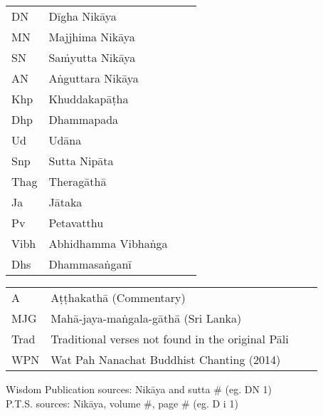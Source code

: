 \begin{tabular}{@{}llll@{}}
  DN    & Dīgha Nikāya                                        \\
  MN    & Majjhima Nikāya                                     \\
  SN    & Saṁyutta Nikāya                                     \\
  AN    & Aṅguttara Nikāya                                    \\
  Khp   & Khuddakapāṭha                                       \\
  Dhp   & Dhammapada                                          \\
  Ud    & Udāna                                               \\
  Snp   & Sutta Nipāta                                        \\
  Thag  & Theragāthā                                          \\
  Ja    & Jātaka                                              \\
  Pv    & Petavatthu                                          \\
  Vibh  & Abhidhamma Vibhaṅga                                 \\
  Dhs   & Dhammasaṅganī                                       \\
\end{tabular}

\begin{tabular}{@{}llll@{}}
  A     & Aṭṭhakathā (Commentary)                             \\
  MJG   & Mahā-jaya-maṅgala-gāthā (Sri Lanka)                 \\
  Trad  & Traditional verses not found in the original Pāli   \\
  WPN   & Wat Pah Nanachat Buddhist Chanting (2014)           \\
\end{tabular}

\medskip

Wisdom Publication sources: Nikāya and sutta \# (eg. DN 1)\\
P.T.S. sources: Nikāya, volume \#, page \# (eg. D i 1)

